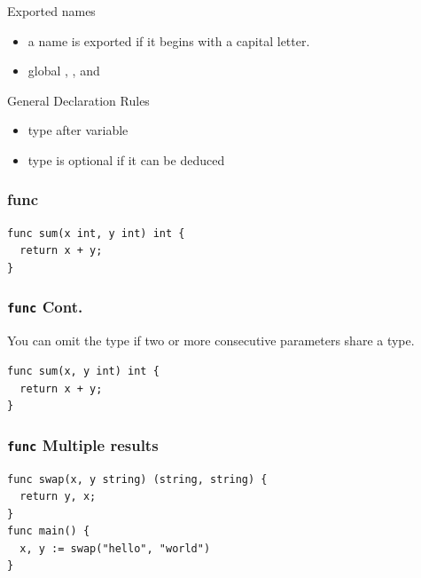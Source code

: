 \documentclass[xetex,mathserif,serif,12pt]{beamer}
\begin{document}
\begin{frame}{Exported names}
  \begin{itemize}
  \item a name is exported if it begins with a capital letter.
  \item global , ,  and
  \end{itemize}
\end{frame}

\begin{frame}{General Declaration Rules}

  \begin{itemize}
  \item type after variable
  \item type is optional if it can be deduced
  \end{itemize}

\end{frame}

\begin{frame}[fragile]
  \frametitle{\ttfamily func}

  \begin{beamer@nomargin}
    \begin{lstlisting}
func sum(x int, y int) int {
  return x + y;
}
    \end{lstlisting}
  \end{beamer@nomargin}
\end{frame}

\begin{frame}[fragile]
  \frametitle{\texttt{func} Cont.}

  You can omit the type if two or more consecutive parameters share a type.
  \newline

  \begin{beamer@nomargin}
    \begin{lstlisting}
func sum(x, y int) int {
  return x + y;
}
    \end{lstlisting}
  \end{beamer@nomargin}
\end{frame}

\begin{frame}[fragile]
  \frametitle{\texttt{func} Multiple results}

  \begin{beamer@nomargin}
    \begin{lstlisting}
func swap(x, y string) (string, string) {
  return y, x;
}
func main() {
  x, y := swap("hello", "world")
}
    \end{lstlisting}
  \end{beamer@nomargin}
\end{frame}
\end{document}
